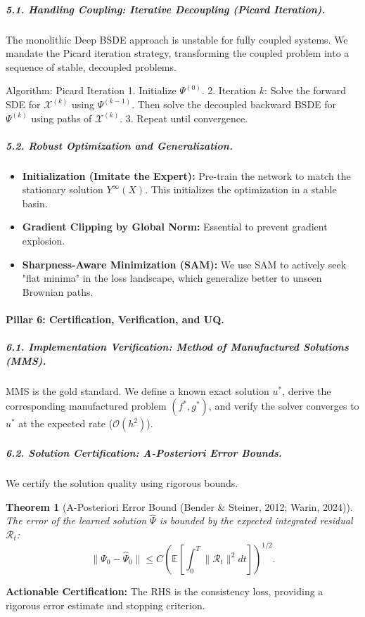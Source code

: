 \documentclass[11pt,letterpaper,oneside]{article}
\theoremstyle{plain}
\newtheorem{theorem}{Theorem}[section]
\theoremstyle{definition}
\theoremstyle{remark}
\begin{document}
\subparagraph{5.1. Handling Coupling: Iterative Decoupling (Picard Iteration).}
The monolithic Deep BSDE approach is unstable for fully coupled systems. We mandate the Picard iteration strategy, transforming the coupled problem into a sequence of stable, decoupled problems.

\begin{distillmethod}{Algorithm: Picard Iteration}
1. Initialize $\Psi^{(0)}$.
2. Iteration $k$: Solve the forward SDE for $\mathcal{X}^{(k)}$ using $\Psi^{(k-1)}$. Then solve the decoupled backward BSDE for $\Psi^{(k)}$ using paths of $\mathcal{X}^{(k)}$.
3. Repeat until convergence.
\end{distillmethod}

\subparagraph{5.2. Robust Optimization and Generalization.}
\begin{itemize}
    \item \textbf{Initialization (Imitate the Expert):} Pre-train the network to match the stationary solution $Y^\infty(X)$. This initializes the optimization in a stable basin.
    \item \textbf{Gradient Clipping by Global Norm:} Essential to prevent gradient explosion.
    \item \textbf{Sharpness-Aware Minimization (SAM):} We use SAM \cite{ForetEtAl2021} to actively seek "flat minima" in the loss landscape, which generalize better to unseen Brownian paths.
\end{itemize}

\paragraph{Pillar 6: Certification, Verification, and UQ.}

\subparagraph{6.1. Implementation Verification: Method of Manufactured Solutions (MMS).}
MMS is the gold standard. We define a known exact solution $u^*$, derive the corresponding manufactured problem $(f^*, g^*)$, and verify the solver converges to $u^*$ at the expected rate ($\mathcal{O}(h^2)$).

\subparagraph{6.2. Solution Certification: A-Posteriori Error Bounds.}
We certify the solution quality using rigorous bounds.

\begin{theorem}[A-Posteriori Error Bound (Bender \& Steiner, 2012; Warin, 2024)]
The error of the learned solution $\hat{\Psi}$ is bounded by the expected integrated residual $\mathcal{R}_t$:
\[
\|\Psi_0 - \hat{\Psi}_0\| \le C \left( \mathbb{E}\left[\int_0^T \|\mathcal{R}_t\|^2 dt\right] \right)^{1/2}.
\]
\end{theorem}
\textbf{Actionable Certification:} The RHS is the consistency loss, providing a rigorous error estimate and stopping criterion.
\end{document}

